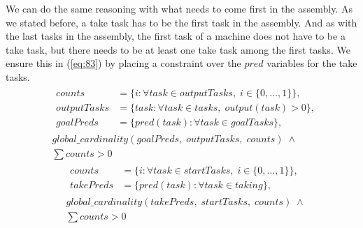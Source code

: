   We can do the same reasoning with what needs to come first in the assembly. As we stated before, a take task has to be the first task in the assembly. And as with the last tasks in the assembly, the first task of a machine does not have to be a take task, but there needs to be at least one take task among the first tasks. We ensure this in (\ref{eq:83}) by placing a constraint over the $pred$ variables for the take tasks.
  \begin{equation}
  \begin{aligned}\label{eq:82}
  &\begin{aligned}
  counts &= \{i : \forall task \in outputTasks, \; i \in \{0 , \ldots , 1\}\}, \\
  outputTasks &= \{task : \forall task \in tasks, \; output(task) > 0\}, \\
  goalPreds &= \{pred(task) : \forall task \in goalTasks\},
  \end{aligned} \\
  &global\_cardinality(goalPreds, \; outputTasks, \; counts) \; \land\\
  &\sum counts > 0
  \end{aligned}
  \end{equation}
   \begin{equation}
   \begin{aligned}\label{eq:83}
   &\begin{aligned}
   counts &= \{i : \forall task \in startTasks, \; i \in \{0 , \ldots , 1\}\}, \\
   takePreds &= \{pred(task) : \forall task \in taking\}, 
   \end{aligned}\\
   &global\_cardinality(takePreds, \; startTasks, \; counts) \; \land\\
   &\sum counts > 0
   \end{aligned}
   \end{equation}
